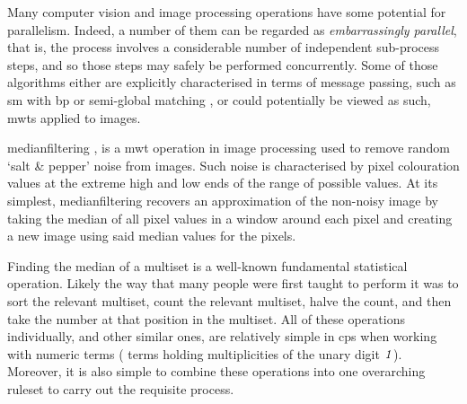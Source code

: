 Many computer vision and image processing operations have some potential for parallelism.  Indeed, a number of them can be regarded as \emph{embarrassingly parallel}, that is, the process involves a considerable number of independent sub-process steps, and so those steps may safely be performed concurrently.  Some of those algorithms either are explicitly characterised in terms of message passing, such as \gls{sm} with \gls{bp} \cite{Liang2011} or semi-global matching \cite{Drory2014}, or could potentially be viewed as such, \eg{} \glspl{mwt} applied to images.

\Gls{medianfilter}ing \cite[Chap. 3.4.1]{Gimelfarb2018}, \cite{Fisher2016} is a \gls{mwt} operation in image processing used to remove random `salt \& pepper' noise from images.  Such noise is characterised by pixel colouration values at the extreme high and low ends of the range of possible values.  At its simplest, \gls{medianfilter}ing recovers an approximation of the non-noisy image by taking the median of all pixel values in a window around each pixel and creating a new image using said median values for the pixels.

Finding the median of a multiset is a well-known fundamental statistical operation.  Likely the way that many people were first taught to perform it was to sort the relevant multiset, count the relevant multiset, halve the count, and then take the number at that position in the multiset.  All of these operations individually, and other similar ones, are relatively simple in \gls{cps} when working with numeric terms (\ie{} terms holding multiplicities of the unary digit \(\mathit{1}\)).  Moreover, it is also simple to combine these operations into one overarching \gls{ruleset} to carry out the requisite process.



